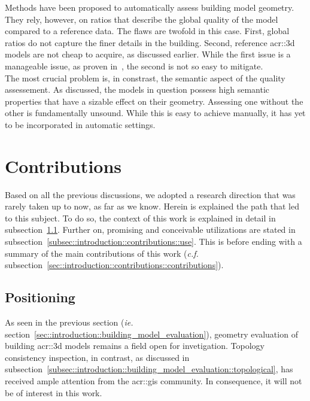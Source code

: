             Methods have been proposed to automatically assess building model geometry.
            They rely, however, on ratios that describe the global quality of the model compared to a reference data.
            The flaws are twofold in this case.
            First, global ratios do not capture the finer details in the building.
            Second, reference \gls{acr::3d} models are not cheap to acquire, as discussed earlier.
            While the first issue is a manageable issue, as proven in~\textcite{rottensteiner2012isprs}, the second is not so easy to mitigate.\\

            The most crucial problem is, in constrast, the semantic aspect of the quality assessement.
            As discussed, the models in question possess high semantic properties that have a sizable effect on their geometry.
            Assessing one without the other is fundamentally unsound.
            While this is easy to achieve manually, it has yet to be incorporated in automatic settings.
\section{Contributions}
    \label{sec::introduction::contributions}
    Based on all the previous discussions, we adopted a research direction that was rarely taken up to now, as far as we know.
    Herein is explained the path that led to this subject.
    To do so, the context of this work is explained in detail in subsection~\ref{subsec::introduction::contributions::positioning}.
    Further on, promising and conceivable utilizations are stated in subsection~\ref{subsec::introduction::contributions::use}.
    This is before ending with a summary of the main contributions of this work (\textit{c.f.} subsection~\ref{sec::introduction::contributions::contributions}).
    
    \subsection{Positioning}
        \label{subsec::introduction::contributions::positioning}
        As seen in the previous section (\textit{ie.} section~\ref{sec::introduction::building_model_evaluation}), geometry evaluation of building \gls{acr::3d} models remains a field open for invetigation.
        Topology consistency inspection, in contrast, as discussed in subsection~\ref{subsec::introduction::building_model_evaluation::topological}, has received ample attention from the \gls{acr::gis} community.
        In consequence, it will not be of interest in this work.\\

